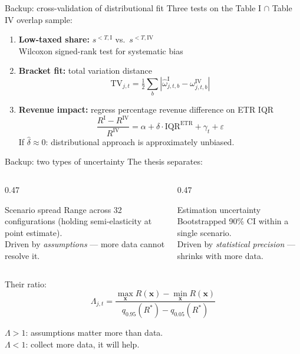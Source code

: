 \documentclass[aspectratio=169, 11pt]{beamer}
\begin{document}
\begin{frame}{Backup: cross-validation of distributional fit}
Three tests on the Table I $\cap$ Table IV overlap sample:

\vspace{0.4em}
\begin{enumerate}
  \item \textbf{Low-taxed share:} $s^{<T,\text{I}}$ vs.\ $s^{<T,\text{IV}}$ \\
    Wilcoxon signed-rank test for systematic bias

  \item \textbf{Bracket fit:} total variation distance
    $$\text{TV}_{j,t} = \tfrac{1}{2}\sum_{b} \left|\hat{\omega}^{\text{I}}_{j,t,b} - \omega^{\text{IV}}_{j,t,b}\right|$$

  \item \textbf{Revenue impact:} regress percentage revenue difference on ETR IQR
    $$\frac{R^{\text{I}} - R^{\text{IV}}}{R^{\text{IV}}} = \alpha + \delta \cdot \text{IQR}^{\text{ETR}} + \gamma_t + \varepsilon$$
    If $\hat{\delta} \approx 0$: distributional approach is approximately unbiased.
\end{enumerate}
\end{frame}


\begin{frame}{Backup: two types of uncertainty}
The thesis separates:

\vspace{0.5em}
\begin{columns}[T]
\begin{column}{0.47\textwidth}
\begin{block}{Scenario spread}
  Range across 32 configurations (holding semi-elasticity at point estimate).\\[4pt]
  Driven by \emph{assumptions} --- more data cannot resolve it.
\end{block}
\end{column}
\begin{column}{0.47\textwidth}
\begin{block}{Estimation uncertainty}
  Bootstrapped 90\% CI within a single scenario.\\[4pt]
  Driven by \emph{statistical precision} --- shrinks with more data.
\end{block}
\end{column}
\end{columns}

\vspace{0.8em}
Their ratio:
$$\Lambda_{j,t} = \frac{\max_{\mathbf{x}} R(\mathbf{x}) - \min_{\mathbf{x}} R(\mathbf{x})}{q_{0.95}(R^*) - q_{0.05}(R^*)}$$

$\Lambda > 1$: assumptions matter more than data.\\
$\Lambda < 1$: collect more data, it will help.
\end{frame}
\end{document}
